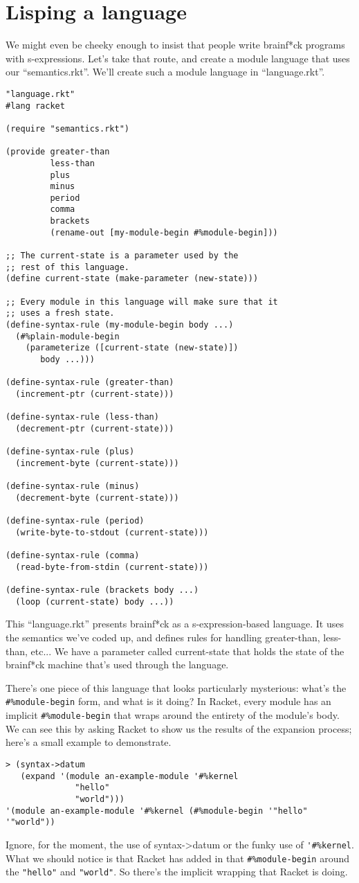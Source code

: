 \documentclass{article}
\begin{document}
\section{Lisping a language}
We might even be cheeky enough to insist that people write brainf*ck programs with s-expressions. Let's take that route, and create a module language that uses our ``semantics.rkt''. We'll create such a module language in ``language.rkt''.
\begin{verbatim}
"language.rkt"
#lang racket
 
(require "semantics.rkt")
 
(provide greater-than
         less-than
         plus
         minus
         period
         comma
         brackets
         (rename-out [my-module-begin #%module-begin]))
 
;; The current-state is a parameter used by the
;; rest of this language.
(define current-state (make-parameter (new-state)))
 
;; Every module in this language will make sure that it
;; uses a fresh state.
(define-syntax-rule (my-module-begin body ...)
  (#%plain-module-begin
    (parameterize ([current-state (new-state)])
       body ...)))
 
(define-syntax-rule (greater-than)
  (increment-ptr (current-state)))
 
(define-syntax-rule (less-than)
  (decrement-ptr (current-state)))
 
(define-syntax-rule (plus)
  (increment-byte (current-state)))
 
(define-syntax-rule (minus)
  (decrement-byte (current-state)))
 
(define-syntax-rule (period)
  (write-byte-to-stdout (current-state)))
 
(define-syntax-rule (comma)
  (read-byte-from-stdin (current-state)))
 
(define-syntax-rule (brackets body ...)
  (loop (current-state) body ...))
\end{verbatim}
This ``language.rkt'' presents brainf*ck as a s-expression-based language. It uses the semantics we've coded up, and defines rules for handling greater-than, less-than, etc... We have a parameter called current-state that holds the state of the brainf*ck machine that's used through the language.

There's one piece of this language that looks particularly mysterious: what's the \verb+#%module-begin+ form, and what is it doing? In Racket, every module has an implicit \verb+#%module-begin+ that wraps around the entirety of the module's body. We can see this by asking Racket to show us the results of the expansion process; here's a small example to demonstrate.
\begin{verbatim}
> (syntax->datum
   (expand '(module an-example-module '#%kernel
              "hello"
              "world")))
'(module an-example-module '#%kernel (#%module-begin '"hello" '"world"))
\end{verbatim}
Ignore, for the moment, the use of syntax->datum or the funky use of \verb+'#%kernel+. What we should notice is that Racket has added in that \verb+#%module-begin+ around the \verb+"hello"+ and \verb+"world"+. So there's the implicit wrapping that Racket is doing.
\end{document}
